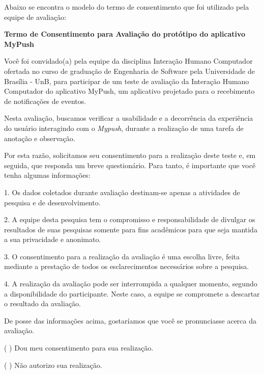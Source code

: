	Abaixo se encontra o modelo do termo de consentimento que foi utilizado pela equipe de avaliação:

      \begin{center}
      
       \textbf{Termo de Consentimento para Avaliação do protótipo do aplicativo MyPush}
       
      \end{center}
      
      Você foi convidado(a) pela equipe da disciplina Interação Humano Computador ofertada no curso de graduação de Engenharia de Software 
      pela Universidade de Brasília - UnB, para participar de um teste de avaliação da Interação Humano Computador do aplicativo MyPush, 
      um aplicativo projetado para o recebimento de notificações de eventos.
      
      Nesta avaliação, buscamos verificar a usabilidade e a decorrência da experiência do usuário interagindo com o \textit{Mypush}, durante a 
      realização de uma tarefa de anotação e observação.

      Por esta razão, solicitamos seu consentimento para a realização deste teste e, em seguida, que responda um breve questionário. 
      Para tanto, é importante que você tenha algumas informações: 
      
      1. Os dados coletados durante avaliação destinam-se apenas a atividades de pesquisa e de desenvolvimento.
      
      2. A equipe desta pesquisa tem o compromisso e responsabilidade de divulgar os resultados de suas pesquisas somente para fins acadêmicos 
      para que seja mantida a sua privacidade e anonimato. 
      
      3. O consentimento para a realização da avaliação é uma escolha livre, feita mediante a prestação de todos os esclarecimentos necessários 
      sobre a pesquisa.
      
      4. A realização da avaliação pode ser interrompida a qualquer momento, segundo a disponibilidade do participante. Neste caso, a equipe se 
      compromete a descartar o resultado da avaliação.
      
      De posse das informações acima, gostaríamos que você se pronunciasse acerca da avaliação.
      
      ( ) Dou meu consentimento para sua realização. 
      
      ( ) Não autorizo sua realização. 
      
